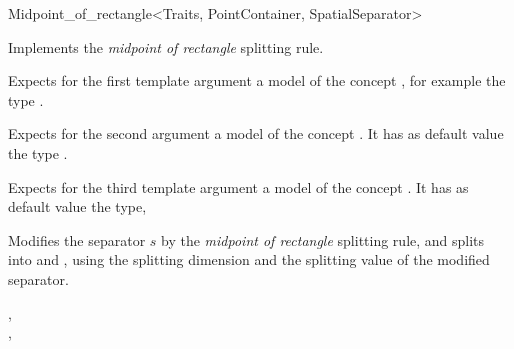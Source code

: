 

\begin{ccRefFunctionObjectClass}{Midpoint_of_rectangle<Traits, PointContainer, SpatialSeparator>}


\ccDefinition
Implements the {\em midpoint of rectangle} splitting rule.

\ccParameters

Expects for the first template argument a model of
the concept , for example
the type . 

Expects for the second argument a model of the concept . It has as default value
the type .

Expects for the third template argument a model of the concept . It has as default value
the type, 


\ccIsModel


\ccTypes



\ccOperations

{Modifies the separator $s$ by the {\em midpoint of rectangle} splitting rule, 
and splits  into  and ,
using the splitting dimension and the splitting value of the modified separator.
}

\ccSeeAlso

,\\
,\\

\end{ccRefFunctionObjectClass}




